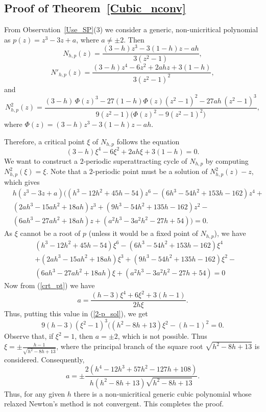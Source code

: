 \documentclass[12pt]{article}
\numberwithin{equation}{section}
\begin{document}
\subsection{Proof of Theorem~\ref{Cubic_nconv}}
From Observation~\ref{Use_SP}(3) we consider a generic, non-unicritical polynomial as $p(z)=z^3-3z+a$, where $a\neq \pm 2$. Then 
$$N_{h,p}(z)=\frac{(3-h)z^3-3(1-h)z-ah}{3(z^2-1)},$$
$$N'_{h,p}(z)=\frac{(3-h)z^4-6z^2+2ahz+3(1-h)}{3(z^2-1)^2},$$ and
$$N^2_{h,p}(z)
=\frac{
	(3-h)\,\Phi(z)^3
	-27(1-h)\Phi(z)(z^2-1)^2
	-27ah\,(z^2-1)^3
}{
	9(z^2-1)\bigl(\Phi(z)^2-9(z^2-1)^2\bigr)
},$$
where $\Phi(z)=(3-h)z^3-3(1-h)z-ah.$

Therefore, a critical point $\xi$ of $N_{h,p}$ follows the equation
\begin{equation}\label{Crit_N}
(3-h)\xi^4-6\xi^2+2ah\xi+3(1-h)=0.
\end{equation}
We want to construct a $2$-periodic superattracting cycle of $N_{h,p}$ by computing $N^2_{h,p}(\xi)=\xi$. Note that a $2$-periodic point must be a solution of $N^2_{h,p}(z)-z$, which gives\\
$$
\begin{aligned}
&h(z^3-3z+a)((h^3-12h^2+45h-54)z^6-(6h^3-54h^2+153h-162)z^4+\\
&(2ah^3-15ah^2+18ah)z^3+(9h^3-54h^2+135h-162)z^2-\\
&(6ah^3-27ah^2+18ah)z+(a^2h^3-3a^2h^2-27h+54))=0.
\end{aligned} 
$$
As $\xi$ cannot be a root of $p$ (unless it would be a fixed point of $N_{h,p}$), we have
\begin{align}\label{2-p_sol}
&(h^3-12h^2+45h-54)\xi^6-(6h^3-54h^2+153h-162)\xi^4\nonumber\\&+(2ah^3-15ah^2+18ah)\xi^3+ (9h^3-54h^2+135h-162)\xi^2-\nonumber\\&(6ah^3-27ah^2+18ah)\xi+(a^2h^3-3a^2h^2-27h+54)=0
\end{align}
Now from (\ref{crt_pt}) we have
\begin{equation}\label{val_a}
a=\frac{(h-3)\xi^4+6\xi^2+3(h-1)}{2h\xi}.
\end{equation}
Thus, putting this value in (\ref{2-p_sol}), we get
$$9(h-3)(\xi^2-1)^3((h^2-8h+13)\xi^2-(h-1)^2=0.$$
Observe that, if $\xi^2=1$, then $a=\pm 2$, which is not possible. Thus $\xi =\pm \frac{h-1}{\sqrt{h^2-8h+13}}$, where the principal branch of the square root $\sqrt{h^2-8h+13}$ is considered. Consequently, $$a=\pm \frac{2(h^4-12h^3+57h^2-127h+108)}{h(h^2-8h+13)\sqrt{h^2-8h+13}}.$$
Thus, for any given $h$ there is a non-unicritical generic cubic polynomial whose relaxed Newton's method is not convergent. This completes the proof.
\end{document}
